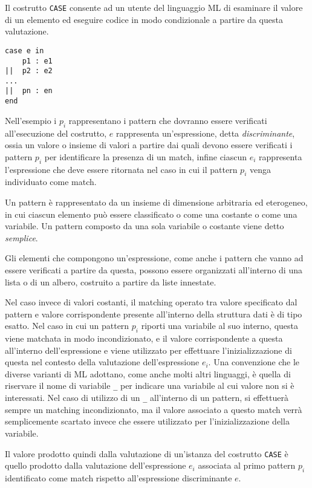 Il costrutto \texttt{CASE} consente ad un utente del linguaggio ML di esaminare
il valore di un elemento ed eseguire codice in modo condizionale a partire da
questa valutazione.

\begin{lstlisting}[caption=Il costrutto \texttt{CASE} presente in LML
  rappresenta un esempio di supporto al pattern matching.]
case e in
    p1 : e1
||  p2 : e2
...
||  pn : en
end
\end{lstlisting}

Nell'esempio i $p_i$ rappresentano i pattern che dovranno essere verificati
all’esecuzione del costrutto, $e$ rappresenta un’espressione, detta
\textit{discriminante}, ossia un valore o insieme di valori a partire dai quali
devono essere verificati i pattern $p_i$ per identificare la presenza di
un match, infine ciascun $e_i$ rappresenta l'espressione che deve essere
ritornata nel caso in cui il pattern $p_i$ venga individuato come match.

Un pattern è rappresentato da un insieme di dimensione arbitraria ed
eterogeneo, in cui ciascun elemento può essere classificato o come una costante
o come una variabile. Un pattern composto da una sola variabile o costante
viene detto \textit{semplice}.

Gli elementi che compongono un'espressione, come anche i pattern che vanno ad
essere verificati a partire da questa, possono essere organizzati all’interno
di una lista o di un albero, costruito a partire da liste innestate.

Nel caso invece di valori costanti, il matching operato tra valore specificato
dal pattern e valore corrispondente presente all'interno della struttura dati è
di tipo esatto. Nel caso in cui un pattern $p_i$ riporti una variabile al suo
interno, questa viene matchata in modo incondizionato, e il valore
corrispondente a questa all’interno dell’espressione e viene utilizzato per
effettuare l’inizializzazione di questa nel contesto della valutazione
dell'espressione $e_i$. Una convenzione che le diverse varianti di ML adottano,
come anche molti altri linguaggi, è quella di riservare il nome di variabile
\texttt{\_} per indicare una variabile al cui valore non si è interessati. Nel
caso di utilizzo di un \texttt{\_} all’interno di un pattern, si effettuerà
sempre un matching incondizionato, ma il valore associato a questo match verrà
semplicemente scartato invece che essere utilizzato per l’inizializzazione
della variabile.

Il valore prodotto quindi dalla valutazione di un'istanza del costrutto
\texttt{CASE} è quello prodotto dalla valutazione dell’espressione $e_i$
associata al primo pattern $p_i$ identificato come match rispetto
all’espressione discriminante $e$.\\

